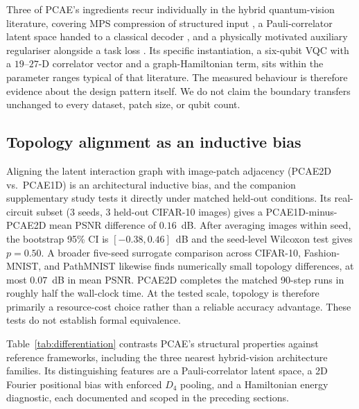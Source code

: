 \documentclass[pdflatex,sn-basic]{sn-jnl}
\begin{document}
Three of PCAE's ingredients recur individually in the hybrid quantum-vision literature, covering MPS compression of structured input \citep{Stoudenmire2016, Han2018, Cirac2021, Guala2023}, a Pauli-correlator latent space handed to a classical decoder \citep{Havlicek2019}, and a physically motivated auxiliary regulariser alongside a task loss \citep{Shi2022}. Its specific instantiation, a six-qubit VQC with a $19$--$27$-D correlator vector and a graph-Hamiltonian term, sits within the parameter ranges typical of that literature. The measured behaviour is therefore evidence about the design pattern itself. We do not claim the boundary transfers unchanged to every dataset, patch size, or qubit count.

\subsection{Topology alignment as an inductive bias}
\label{sec:topology}

Aligning the latent interaction graph with image-patch adjacency (PCAE2D vs.\ PCAE1D) is an architectural inductive bias, and the companion supplementary study tests it directly under matched held-out conditions. Its real-circuit subset (3 seeds, 3 held-out CIFAR-10 images) gives a PCAE1D-minus-PCAE2D mean PSNR difference of $0.16$~dB. After averaging images within seed, the bootstrap 95\% CI is $[-0.38,0.46]$~dB and the seed-level Wilcoxon test gives $p=0.50$. A broader five-seed surrogate comparison across CIFAR-10, Fashion-MNIST, and PathMNIST likewise finds numerically small topology differences, at most $0.07$~dB in mean PSNR. PCAE2D completes the matched 90-step runs in roughly half the wall-clock time. At the tested scale, topology is therefore primarily a resource-cost choice rather than a reliable accuracy advantage. These tests do not establish formal equivalence.

Table~\ref{tab:differentiation} contrasts PCAE's structural properties against reference frameworks, including the three nearest hybrid-vision architecture families. Its distinguishing features are a Pauli-correlator latent space, a 2D Fourier positional bias with enforced $D_4$ pooling, and a Hamiltonian energy diagnostic, each documented and scoped in the preceding sections.
\end{document}
